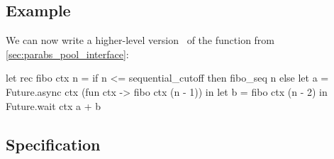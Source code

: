 \subsection{Example}
\label{sec:parabs_future_example}

We can now write a higher-level version~ of the
 function from \cref{sec:parabs_pool_interface}:
\begin{ocamlcode}
let rec fibo ctx n =
  if n <= sequential_cutoff then fibo_seq n
  else
    let a = Future.async ctx (fun ctx -> fibo ctx (n - 1)) in
    let b = fibo ctx (n - 2) in
    Future.wait ctx a + b
\end{ocamlcode}

\subsection{Specification}
\label{sec:parabs_future_spec}

